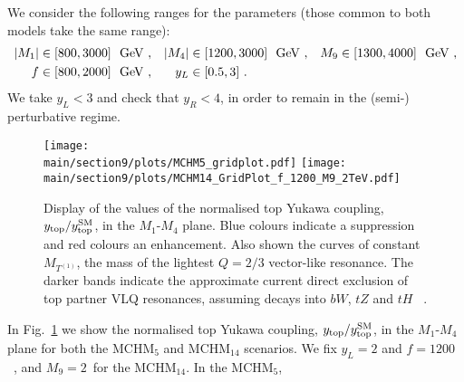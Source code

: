 We consider the following ranges for the parameters (those common to both models take the same range):
\begin{align*}
|M_1|& \in [800, 3000]~{\rm ~\text{GeV}}~, &  |M_4| &\in [1200, 3000]~{\rm ~\text{GeV}}~,  &  M_9 &\in [1300, 4000]~{\rm ~\text{GeV}}~,  \\
f&\in [800, 2000]~{\rm ~\text{GeV}}~,          &  y_L&\in [0.5, 3] ~.
\end{align*}
%
We take $y_L < 3$ and check that $y_R < 4$, in order to remain in the (semi-) perturbative regime.
%
\begin{figure}[t]
\centering
\texttt{[image: \\main/section9/plots/MCHM5\_gridplot.pdf]}
\hspace{3mm}
\texttt{[image: \\main/section9/plots/MCHM14\_GridPlot\_f\_1200\_M9\_2TeV.pdf]}
\caption{Display of the values of the normalised top Yukawa coupling,
$y_{\rm top} / y_{\rm top}^{\rm SM}$, in the $M_1$-$M_4$ plane.  Blue
colours indicate a suppression and red colours an enhancement.  Also
shown the curves of constant $M_{T^{(1)}}$, the mass of the lightest $Q=2/3$
vector-like resonance.  The darker bands indicate the approximate
current direct exclusion of top partner VLQ resonances, assuming decays into
$bW$, $tZ$ and $tH$ ~\cite{Aaboud:2018pii, Sirunyan:2018omb}.}
\label{fig:ytvsM1M4}
\end{figure}
%
In Fig.~\ref{fig:ytvsM1M4} we show the normalised top Yukawa coupling,
$y_{\rm top} / y_{\rm top}^{\rm SM}$, in the $M_1$-$M_4$ plane for
both the MCHM$_5$ and MCHM$_{14}$ scenarios.  We fix $y_L = 2$ and $f
= 1200$~\UGeV, and $M_9 = 2$~\UTeV for the MCHM$_{14}$.  In the MCHM$_5$,
